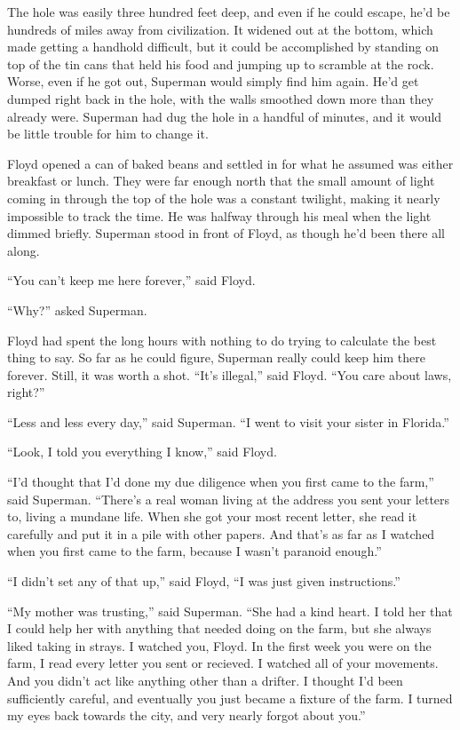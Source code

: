\documentclass[ebook,12pt]{memoir}
\begin{document}
The hole was easily three hundred feet deep, and even if he could
escape, he'd be hundreds of miles away from civilization. It widened out
at the bottom, which made getting a handhold difficult, but it could be
accomplished by standing on top of the tin cans that held his food and
jumping up to scramble at the rock. Worse, even if he got out, Superman
would simply find him again. He'd get dumped right back in the hole,
with the walls smoothed down more than they already were. Superman had
dug the hole in a handful of minutes, and it would be little trouble for
him to change it.

Floyd opened a can of baked beans and settled in for what he assumed was
either breakfast or lunch. They were far enough north that the small
amount of light coming in through the top of the hole was a constant
twilight, making it nearly impossible to track the time. He was halfway
through his meal when the light dimmed briefly. Superman stood in front
of Floyd, as though he'd been there all along.

``You can't keep me here forever,'' said Floyd.

``Why?'' asked Superman.

Floyd had spent the long hours with nothing to do trying to calculate
the best thing to say. So far as he could figure, Superman really could
keep him there forever. Still, it was worth a shot. ``It's illegal,''
said Floyd. ``You care about laws, right?''

``Less and less every day,'' said Superman. ``I went to visit your
sister in Florida.''

``Look, I told you everything I know,'' said Floyd.

``I'd thought that I'd done my due diligence when you first came to the
farm,'' said Superman. ``There's a real woman living at the address you
sent your letters to, living a mundane life. When she got your most
recent letter, she read it carefully and put it in a pile with other
papers. And that's as far as I watched when you first came to the farm,
because I wasn't paranoid enough.''

``I didn't set any of that up,'' said Floyd, ``I was just given
instructions.''

``My mother was trusting,'' said Superman. ``She had a kind heart. I
told her that I could help her with anything that needed doing on the
farm, but she always liked taking in strays. I watched you, Floyd. In
the first week you were on the farm, I read every letter you sent or
recieved. I watched all of your movements. And you didn't act like
anything other than a drifter. I thought I'd been sufficiently careful,
and eventually you just became a fixture of the farm. I turned my eyes
back towards the city, and very nearly forgot about you.''
\end{document}

